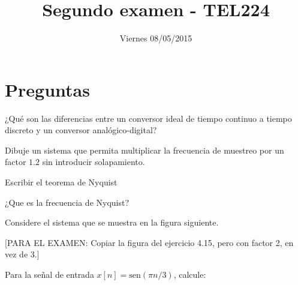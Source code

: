 \documentclass[addpoints]{exam}
\begin{document}
\headrule


\title{Segundo examen - TEL224}
\date{Viernes 08/05/2015}
\maketitle

\vspace{0.1in}

\section*{Preguntas}

\begin{questions}
\question[5]
¿Qué son las diferencias entre un conversor ideal de tiempo continuo a tiempo discreto y un conversor analógico-digital?

\question[5]
Dibuje un sistema que permita multiplicar la frecuencia de muestreo por un factor \(1.2\) sin introducir solapamiento.

\question[5]
Escribir el teorema de Nyquist

\newpage

\question[5]
¿Que es la frecuencia de Nyquist?

\question[5]
Considere el sistema que se muestra en la figura siguiente.

[PARA EL EXAMEN: Copiar la figura del ejercicio 4.15, pero con factor 2, en vez de 3.]

Para la señal de entrada \(x[n] = \text{sen}(\pi n / 3)\), calcule:

\end{questions}
\end{document}
